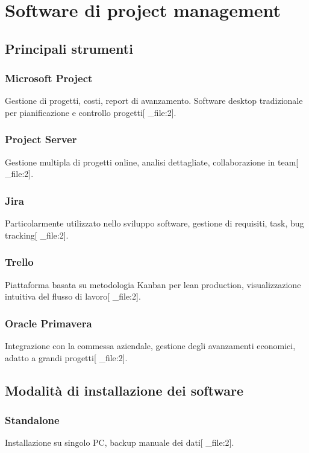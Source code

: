 \documentclass[12pt,a4paper]{article}
\begin{document}
\section{Software di project management}

\subsection{Principali strumenti}

\subsubsection{Microsoft Project}
Gestione di progetti, costi, report di avanzamento. Software desktop tradizionale per pianificazione e controllo progetti[ _file:2].

\subsubsection{Project Server}
Gestione multipla di progetti online, analisi dettagliate, collaborazione in team[ _file:2].

\subsubsection{Jira}
Particolarmente utilizzato nello sviluppo software, gestione di requisiti, task, bug tracking[ _file:2].

\subsubsection{Trello}
Piattaforma basata su metodologia Kanban per lean production, visualizzazione intuitiva del flusso di lavoro[ _file:2].

\subsubsection{Oracle Primavera}
Integrazione con la commessa aziendale, gestione degli avanzamenti economici, adatto a grandi progetti[ _file:2].

\subsection{Modalità di installazione dei software}

\subsubsection{Standalone}
Installazione su singolo PC, backup manuale dei dati[ _file:2].
\end{document}
